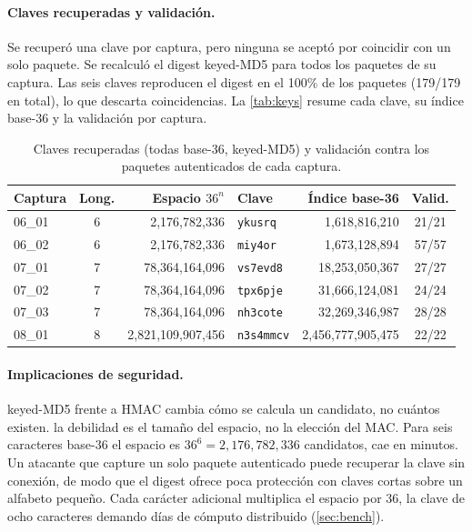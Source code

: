 \paragraph{Claves recuperadas y validación.} Se recuperó una clave por captura, pero ninguna se aceptó por coincidir con un solo paquete. Se recalculó el digest keyed-MD5 para todos los paquetes de su captura. Las seis claves reproducen el digest en el 100\% de los paquetes (179/179 en total), lo que descarta coincidencias. La \autoref{tab:keys} resume cada clave, su índice base-36 y la validación por captura.

\begin{table}[H]
\centering
\footnotesize
\begin{tabular}{l c r l r c}
\hline
\textbf{Captura} & \textbf{Long.} & \textbf{Espacio $36^{n}$} & \textbf{Clave} & \textbf{Índice base-36} & \textbf{Valid.}\\
\hline
06\_01 & 6 & 2{,}176{,}782{,}336     & \texttt{ykusrq}   & 1{,}618{,}816{,}210     & 21/21\\
06\_02 & 6 & 2{,}176{,}782{,}336     & \texttt{miy4or}   & 1{,}673{,}128{,}894     & 57/57\\
07\_01 & 7 & 78{,}364{,}164{,}096    & \texttt{vs7evd8}  & 18{,}253{,}050{,}367    & 27/27\\
07\_02 & 7 & 78{,}364{,}164{,}096    & \texttt{tpx6pje}  & 31{,}666{,}124{,}081    & 24/24\\
07\_03 & 7 & 78{,}364{,}164{,}096    & \texttt{nh3cote}  & 32{,}269{,}346{,}987    & 28/28\\
08\_01 & 8 & 2{,}821{,}109{,}907{,}456 & \texttt{n3s4mmcv} & 2{,}456{,}777{,}905{,}475 & 22/22\\
\hline
\end{tabular}
\caption{Claves recuperadas (todas base-36, keyed-MD5) y validación contra los paquetes autenticados de cada captura.}
\label{tab:keys}
\end{table}

\paragraph{Implicaciones de seguridad.} keyed-MD5 frente a HMAC cambia cómo se calcula un candidato, no cuántos existen. la debilidad es el tamaño del espacio, no la elección del MAC. Para seis caracteres base-36 el espacio es $36^6 = 2{,}176{,}782{,}336$ candidatos, cae en minutos. Un atacante que capture un solo paquete autenticado puede recuperar la clave sin conexión, de modo que el digest ofrece poca protección con claves cortas sobre un alfabeto pequeño. Cada carácter adicional multiplica el espacio por 36, la clave de ocho caracteres demando días de cómputo distribuido (\autoref{sec:bench}).
